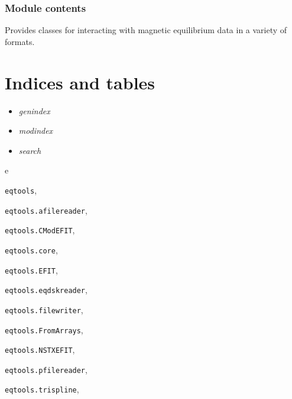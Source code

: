 \documentclass[letterpaper,10pt,english]{sphinxmanual}
\begin{document}
\subsection{Module contents}
\label{eqtools:module-eqtools}\label{eqtools:module-contents}
Provides classes for interacting with magnetic equilibrium data in a variety of formats.


\chapter{Indices and tables}
\label{index:indices-and-tables}\begin{itemize}
\item {} 
\emph{genindex}

\item {} 
\emph{modindex}

\item {} 
\emph{search}

\end{itemize}


\renewcommand{\indexname}{Python Module Index}
\begin{theindex}
\def\bigletter#1{{\Large\sffamily#1}\nopagebreak\vspace{1mm}}
\bigletter{e}
\item {\texttt{eqtools}}, \pageref{eqtools:module-eqtools}
\item {\texttt{eqtools.afilereader}}, \pageref{eqtools:module-eqtools.afilereader}
\item {\texttt{eqtools.CModEFIT}}, \pageref{eqtools:module-eqtools.CModEFIT}
\item {\texttt{eqtools.core}}, \pageref{eqtools:module-eqtools.core}
\item {\texttt{eqtools.EFIT}}, \pageref{eqtools:module-eqtools.EFIT}
\item {\texttt{eqtools.eqdskreader}}, \pageref{eqtools:module-eqtools.eqdskreader}
\item {\texttt{eqtools.filewriter}}, \pageref{eqtools:module-eqtools.filewriter}
\item {\texttt{eqtools.FromArrays}}, \pageref{eqtools:module-eqtools.FromArrays}
\item {\texttt{eqtools.NSTXEFIT}}, \pageref{eqtools:module-eqtools.NSTXEFIT}
\item {\texttt{eqtools.pfilereader}}, \pageref{eqtools:module-eqtools.pfilereader}
\item {\texttt{eqtools.trispline}}, \pageref{eqtools:module-eqtools.trispline}
\end{theindex}

\renewcommand{\indexname}{Index}
\printindex
\end{document}

